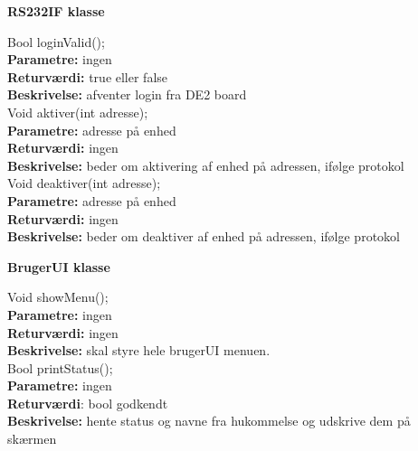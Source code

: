 {\centering 
\textbf{RS232IF klasse}\par
}

Bool loginValid(); \\
\textbf{Parametre:} ingen \\
\textbf{Returværdi:} true eller false \\
\textbf{Beskrivelse:} afventer login fra DE2 board \\

Void aktiver(int adresse); \\
\textbf{Parametre:} adresse på enhed \\
\textbf{Returværdi:} ingen \\
\textbf{Beskrivelse:} beder om aktivering af enhed på adressen, ifølge protokol \\

Void deaktiver(int adresse); \\
\textbf{Parametre:} adresse på enhed \\
\textbf{Returværdi:} ingen \\
\textbf{Beskrivelse:} beder om deaktiver af enhed på adressen, ifølge protokol \\

{\centering 
\textbf{BrugerUI klasse}\par
}

Void showMenu(); \\
\textbf{Parametre:} ingen \\
\textbf{Returværdi:} ingen \\
\textbf{Beskrivelse:} skal styre hele brugerUI menuen. \\

Bool printStatus(); \\
\textbf{Parametre:} ingen \\
\textbf{Returværdi}: bool godkendt \\
\textbf{Beskrivelse:} hente status og navne fra hukommelse og udskrive dem på skærmen \\












